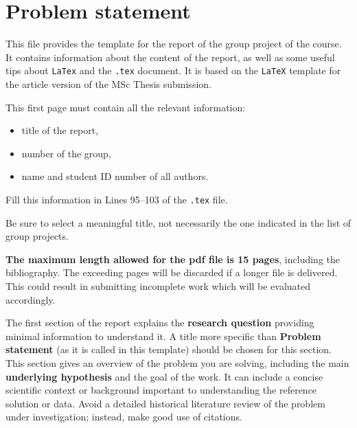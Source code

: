 \documentclass[11pt,a4paper]{article}
\begin{document}



\section{Problem statement}
\label{sec:probStatement}
This file provides the template for the report of the group project of the course.
It contains information about the content of the report, as well as some useful tips about \texttt{LaTex} and the \texttt{.tex} document. It is based on the \texttt{LaTeX} template for the article version of the MSc Thesis submission.

This first page must contain all the relevant information:
\begin{itemize}
    \item title of the report,
    \item number of the group,
    \item name and student ID number of all authors.
\end{itemize}
Fill this information in \textsf{Lines 95--103} of the \texttt{.tex} file.

Be sure to select a meaningful title, not necessarily the one indicated in the list of group projects.

\textbf{The maximum length allowed for the pdf file is 15 pages}, including the bibliography. The exceeding pages will be discarded if a longer file is delivered. This could result in submitting incomplete work which will be evaluated accordingly.

The first section of the report explains the \textbf{research question} providing minimal information to understand it. A title more specific than  \textbf{Problem statement} (as it is called in this template) should be chosen for this section.
This section gives an overview of the problem you are solving, including the main \textbf{underlying hypothesis} and the goal of the work. It can include a concise scientific context or background important to understanding the reference solution or data. Avoid a detailed historical literature review of the problem under investigation; instead, make good use of citations. \\
\end{document}
